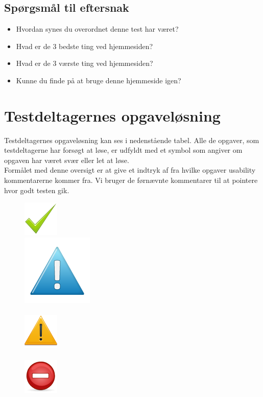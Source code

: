 \documentclass[12pt]{article}
\begin{document}
\subsection{Spørgsmål til eftersnak}
\begin{itemize}
  \item Hvordan synes du overordnet denne test har været?
  \item Hvad er de 3 bedste ting ved hjemmesiden?
  \item Hvad er de 3 værste ting ved hjemmesiden?
  \item Kunne du finde på at bruge denne hjemmeside igen?
\end{itemize}

\section{Testdeltagernes opgaveløsning}
Testdeltagernes opgaveløsning kan ses i nedenstående tabel. Alle de opgaver, som testdeltagerne har forsøgt at løse, er udfyldt med et symbol som angiver om opgaven har været svær eller let at løse. \\
\noindent Formålet med denne oversigt er at give et indtryk af fra hvilke opgaver usability kommentarerne kommer fra.
Vi bruger de førnævnte kommentarer til at pointere hvor godt testen gik.\\
 \begin{figure}
  \includegraphics[scale=0.4]{Billeder/godt} \\
  \includegraphics[scale=0.3]{Billeder/mindre}  \\ \\
  \includegraphics[scale=0.5]{Billeder/alvorligt}  \\ \\
    \includegraphics[scale=0.6]{Billeder/kritisk}
\end{figure}\\ \\
\end{document}
